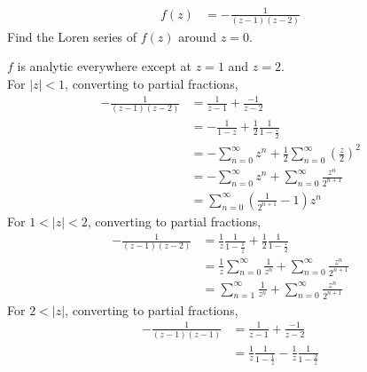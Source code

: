 \documentclass[titlepage, fleqn, a4paper, 12pt, twoside]{article}
\theoremstyle{definition}
\theoremstyle{theorem}
\begin{document}
\begin{question}
	\begin{align*}
		f(z) & = -\frac{1}{(z - 1) (z - 2)}
	\end{align*}
	Find the Loren series of $f(z)$ around $z = 0$.
\end{question}

\begin{solution}
	$f$ is analytic everywhere except at $z = 1$ and $z = 2$.\\
	For $|z| < 1$, converting to partial fractions,
	\begin{align*}
		-\frac{1}{(z - 1) (z - 2)} & = \frac{1}{z - 1} + \frac{-1}{z - 2}                                                                        \\
                                           & = -\frac{1}{1 - z} + \frac{1}{2} \frac{1}{1 - \frac{z}{2}}                                                  \\
                                           & = -\sum\limits_{n = 0}^{\infty} z^n + \frac{1}{2} \sum\limits_{n = 0}^{\infty} \left( \frac{z}{2} \right)^2 \\
                                           & = -\sum\limits_{n = 0}^{\infty} z^n + \sum\limits_{n = 0}^{\infty} \frac{z^n}{2^{n + 1}}                    \\
                                           & = \sum\limits_{n = 0}^{\infty} \left( \frac{1}{2^{n + 1}} - 1 \right) z^n
	\end{align*}
	For $1 < |z| < 2$, converting to partial fractions,
	\begin{align*}
		-\frac{1}{(z - 1) (z - 2)} & = \frac{1}{z} \frac{1}{1 - \frac{1}{z}} + \frac{1}{2} \frac{1}{1 - \frac{z}{2}}                               \\
                                           & = \frac{1}{z} \sum\limits_{n = 0}^{\infty} \frac{1}{z^n} + \sum\limits_{n = 0}^{\infty} \frac{z^n}{2^{n + 1}} \\
                                           & = \sum\limits_{n = 1}^{\infty} \frac{1}{z^n} + \sum\limits_{n = 0}^{\infty} \frac{z^n}{2^{n + 1}}
	\end{align*}
	For $2 < |z|$, converting to partial fractions,
	\begin{align*}
		-\frac{1}{(z - 1) (z - 1)} & = \frac{1}{z - 1} + \frac{-1}{z - 2}                                                                                             \\
                                           & = \frac{1}{z} \frac{1}{1 - \frac{1}{z}} - \frac{1}{z} \frac{1}{1 - \frac{2}{z}}                                                  \\

\end{align*}
\end{solution}
\end{document}
